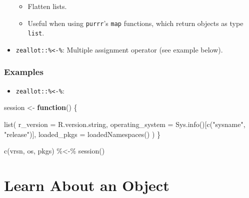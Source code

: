 \documentclass[
]{book}
\newenvironment{Shaded}{\begin{snugshade}}{\end{snugshade}}
\newcommand{\AttributeTok}[1]{\textcolor[rgb]{0.77,0.63,0.00}{#1}}
\newcommand{\ControlFlowTok}[1]{\textcolor[rgb]{0.13,0.29,0.53}{\textbf{#1}}}
\newcommand{\FunctionTok}[1]{\textcolor[rgb]{0.00,0.00,0.00}{#1}}
\newcommand{\NormalTok}[1]{#1}
\newcommand{\OtherTok}[1]{\textcolor[rgb]{0.56,0.35,0.01}{#1}}
\newcommand{\SpecialCharTok}[1]{\textcolor[rgb]{0.00,0.00,0.00}{#1}}
\newcommand{\StringTok}[1]{\textcolor[rgb]{0.31,0.60,0.02}{#1}}
\providecommand{\tightlist}{%
  \setlength{\itemsep}{0pt}\setlength{\parskip}{0pt}}
\begin{document}
\begin{itemize}
  \begin{itemize}
  \tightlist
  \item
    Flatten lists.
  \item
    Useful when using \texttt{purrr}'s \texttt{map} functions, which return objects as type \texttt{list}.
  \end{itemize}
\item
  \texttt{zeallot::\%\textless{}-\%}: Multiple assignment operator (see example below).
\end{itemize}

\hypertarget{examples-6}{%
\subsubsection{Examples}\label{examples-6}}

\begin{itemize}
\tightlist
\item
  \texttt{zeallot::\%\textless{}-\%}:
\end{itemize}

\begin{Shaded}
\begin{Highlighting}[]
\NormalTok{session }\OtherTok{\textless{}{-}} \ControlFlowTok{function}\NormalTok{() \{}
  
  \FunctionTok{list}\NormalTok{(}
    \AttributeTok{r\_version        =}\NormalTok{ R.version.string,}
    \AttributeTok{operating\_system =} \FunctionTok{Sys.info}\NormalTok{()[}\FunctionTok{c}\NormalTok{(}\StringTok{"sysname"}\NormalTok{, }\StringTok{"release"}\NormalTok{)],}
    \AttributeTok{loaded\_pkgs      =} \FunctionTok{loadedNamespaces}\NormalTok{()}
\NormalTok{  )}
\NormalTok{\}}

\FunctionTok{c}\NormalTok{(vrsn, os, pkgs) }\SpecialCharTok{\%\textless{}{-}\%} \FunctionTok{session}\NormalTok{() }
\end{Highlighting}
\end{Shaded}

\hypertarget{learn-about-an-object}{%
\section{Learn About an Object}\label{learn-about-an-object}}
\end{document}
